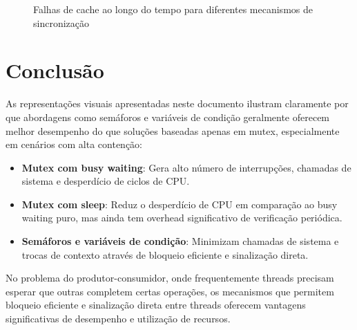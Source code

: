 \documentclass[12pt]{article}
\begin{document}
\begin{figure}[h]
\centering
{}
\caption{Falhas de cache ao longo do tempo para diferentes mecanismos de sincronização}
\end{figure}

\section{Conclusão}

As representações visuais apresentadas neste documento ilustram claramente por que abordagens como semáforos e variáveis de condição geralmente oferecem melhor desempenho do que soluções baseadas apenas em mutex, especialmente em cenários com alta contenção:

\begin{itemize}
    \item \textbf{Mutex com busy waiting}: Gera alto número de interrupções, chamadas de sistema e desperdício de ciclos de CPU.
    \item \textbf{Mutex com sleep}: Reduz o desperdício de CPU em comparação ao busy waiting puro, mas ainda tem overhead significativo de verificação periódica.
    \item \textbf{Semáforos e variáveis de condição}: Minimizam chamadas de sistema e trocas de contexto através de bloqueio eficiente e sinalização direta.
\end{itemize}

No problema do produtor-consumidor, onde frequentemente threads precisam esperar que outras completem certas operações, os mecanismos que permitem bloqueio eficiente e sinalização direta entre threads oferecem vantagens significativas de desempenho e utilização de recursos.
\end{document}
